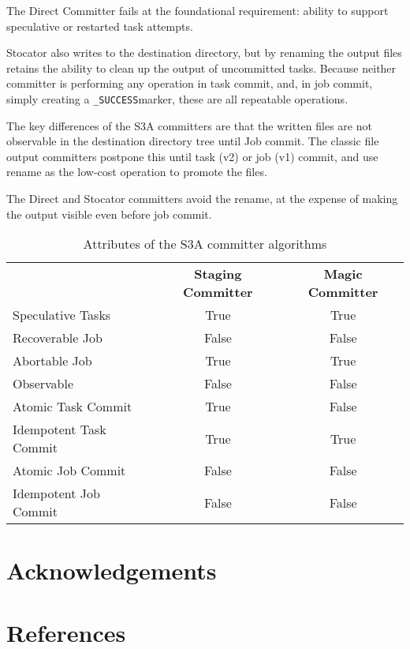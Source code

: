 \documentclass[9pt,technote]{IEEEtran}
\begin{document}
The Direct Committer fails at the foundational requirement: ability to support
speculative or restarted task attempts.

Stocator also writes to the destination directory, but by renaming the output
files retains the ability to clean up the output of uncommitted tasks.
Because neither committer is performing any operation in task commit, and,
in job commit, simply creating a \texttt{\_SUCCESS}marker, these are all
repeatable operations.


The key differences of the S3A committers are that the written files are
not observable in the destination directory tree until Job commit.
The classic file output committers postpone this until task (v2) or job (v1)
commit, and use rename as the low-cost operation to promote the files.

The Direct and Stocator committers avoid the rename, at the expense of making
the output visible even before job commit.

\begin{table}
  \label{tab:s3a-committer-attributes}
  \begin{tabular}{ l c c }
    \hline
    & \textbf{Staging Committer} & \textbf{Magic Committer} \\
    Speculative Tasks & True & True \\
    Recoverable Job & False & False \\
    Abortable Job & True & True \\
    Observable & False & False \\
    Atomic Task Commit & True & False \\
    Idempotent Task Commit & True & True \\
    Atomic Job Commit & False & False \\
    Idempotent Job Commit & False & False \\
    \hline
  \end{tabular}
  \caption{Attributes of the S3A committer algorithms}
\end{table}




\section{Acknowledgements}
\label{sec:acknowledgements}

\section{References}
\label{sec:references}
\end{document}
